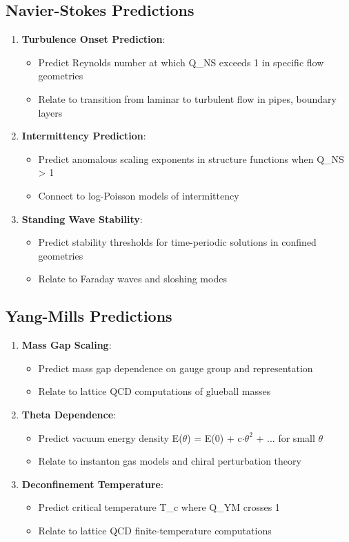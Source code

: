 \documentclass[11pt]{article}
\begin{document}
\subsection{Navier-Stokes Predictions}
\begin{enumerate}
\item \textbf{Turbulence Onset Prediction}:
  \begin{itemize}
  \item Predict Reynolds number at which Q\_NS exceeds 1 in specific flow geometries
  \item Relate to transition from laminar to turbulent flow in pipes, boundary layers
  \end{itemize}
\item \textbf{Intermittency Prediction}:
  \begin{itemize}
  \item Predict anomalous scaling exponents in structure functions when Q\_NS > 1
  \item Connect to log-Poisson models of intermittency
  \end{itemize}
\item \textbf{Standing Wave Stability}:
  \begin{itemize}
  \item Predict stability thresholds for time-periodic solutions in confined geometries
  \item Relate to Faraday waves and sloshing modes
  \end{itemize}
\end{enumerate}

\subsection{Yang-Mills Predictions}
\begin{enumerate}
\item \textbf{Mass Gap Scaling}:
  \begin{itemize}
  \item Predict mass gap dependence on gauge group and representation
  \item Relate to lattice QCD computations of glueball masses
  \end{itemize}
\item \textbf{Theta Dependence}:
  \begin{itemize}
  \item Predict vacuum energy density E($\theta$) = E(0) + c$\cdot$$\theta^2$ + ... for small $\theta$
  \item Relate to instanton gas models and chiral perturbation theory
  \end{itemize}
\item \textbf{Deconfinement Temperature}:
  \begin{itemize}
  \item Predict critical temperature T\_c where Q\_YM crosses 1
  \item Relate to lattice QCD finite-temperature computations
  \end{itemize}
\end{enumerate}
\end{document}

